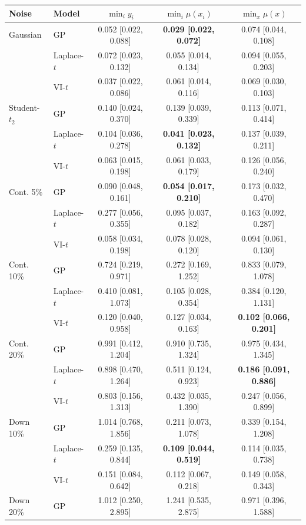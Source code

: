 \begin{tabular}{llccc}
\toprule
Noise & Model & $\min_i y_i$ & $\min_i \mu(x_i)$ & $\min_x \mu(x)$ \\
\midrule
Gaussian & GP & 0.052 [0.022, 0.088] & \textbf{0.029 [0.022, 0.072]} & 0.074 [0.044, 0.108] \\
 & Laplace-$t$ & 0.072 [0.023, 0.132] & 0.055 [0.014, 0.134] & 0.094 [0.055, 0.203] \\
 & VI-$t$ & 0.037 [0.022, 0.086] & 0.061 [0.014, 0.116] & 0.069 [0.030, 0.103] \\
\midrule
Student-$t_2$ & GP & 0.140 [0.024, 0.370] & 0.139 [0.039, 0.339] & 0.113 [0.071, 0.414] \\
 & Laplace-$t$ & 0.104 [0.036, 0.278] & \textbf{0.041 [0.023, 0.132]} & 0.137 [0.039, 0.211] \\
 & VI-$t$ & 0.063 [0.015, 0.198] & 0.061 [0.033, 0.179] & 0.126 [0.056, 0.240] \\
\midrule
Cont. 5\% & GP & 0.090 [0.048, 0.161] & \textbf{0.054 [0.017, 0.210]} & 0.173 [0.032, 0.470] \\
 & Laplace-$t$ & 0.277 [0.056, 0.355] & 0.095 [0.037, 0.182] & 0.163 [0.092, 0.287] \\
 & VI-$t$ & 0.058 [0.034, 0.198] & 0.078 [0.028, 0.120] & 0.094 [0.061, 0.130] \\
\midrule
Cont. 10\% & GP & 0.724 [0.219, 0.971] & 0.272 [0.169, 1.252] & 0.833 [0.079, 1.078] \\
 & Laplace-$t$ & 0.410 [0.081, 1.073] & 0.105 [0.028, 0.354] & 0.384 [0.120, 1.131] \\
 & VI-$t$ & 0.120 [0.040, 0.958] & 0.127 [0.034, 0.163] & \textbf{0.102 [0.066, 0.201]} \\
\midrule
Cont. 20\% & GP & 0.991 [0.412, 1.204] & 0.910 [0.735, 1.324] & 0.975 [0.434, 1.345] \\
 & Laplace-$t$ & 0.898 [0.470, 1.264] & 0.511 [0.124, 0.923] & \textbf{0.186 [0.091, 0.886]} \\
 & VI-$t$ & 0.803 [0.156, 1.313] & 0.432 [0.035, 1.390] & 0.247 [0.056, 0.899] \\
\midrule
Down 10\% & GP & 1.014 [0.768, 1.856] & 0.211 [0.073, 1.078] & 0.339 [0.154, 1.208] \\
 & Laplace-$t$ & 0.259 [0.135, 0.844] & \textbf{0.109 [0.044, 0.519]} & 0.114 [0.035, 0.738] \\
 & VI-$t$ & 0.151 [0.084, 0.642] & 0.112 [0.067, 0.218] & 0.149 [0.058, 0.343] \\
\midrule
Down 20\% & GP & 1.012 [0.250, 2.895] & 1.241 [0.535, 2.875] & 0.971 [0.396, 1.588] \\

\end{tabular}

